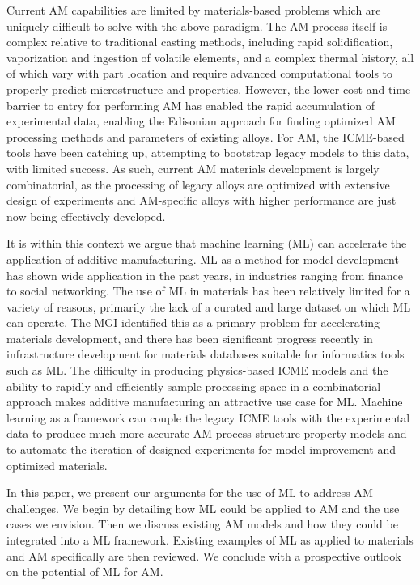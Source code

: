 Current AM capabilities are limited by materials-based problems which are uniquely difficult to solve with the above paradigm. The AM process itself is complex relative to traditional casting methods, including rapid solidification, vaporization and ingestion of volatile elements, and a complex thermal history, all of which vary with part location and require advanced computational tools to properly predict microstructure and properties. However, the lower cost and time barrier to entry for performing AM has enabled the rapid accumulation of experimental data, enabling the Edisonian approach for finding optimized AM processing methods and parameters of existing alloys. For AM, the ICME-based tools have been catching up, attempting to bootstrap legacy models to this data, with limited success. As such, current AM materials development is largely combinatorial, as the processing of legacy alloys are optimized with extensive design of experiments and AM-specific alloys with higher performance are just now being effectively developed.

It is within this context we argue that machine learning (ML) can accelerate the application of additive manufacturing. ML as a method for model development has shown wide application in the past years, in industries ranging from finance to social networking. The use of ML in materials has been relatively limited for a variety of reasons, primarily the lack of a curated and large dataset on which ML can operate. The MGI identified this as a primary problem for accelerating materials development, and there has been significant progress recently in infrastructure development for materials databases suitable for informatics tools such as ML. The difficulty in producing physics-based ICME models and the ability to rapidly and efficiently sample processing space in a combinatorial approach makes additive manufacturing an attractive use case for ML. Machine learning as a framework can couple the legacy ICME tools with the experimental data to produce much more accurate AM process-structure-property models and to automate the iteration of designed experiments for model improvement and optimized materials.

In this paper, we present our arguments for the use of ML to address AM challenges. We begin by detailing how ML could be applied to AM and the use cases we envision. Then we discuss existing AM models and how they could be integrated into a ML framework. Existing examples of ML as applied to materials and AM specifically are then reviewed. We conclude with a prospective outlook on the potential of ML for AM.

